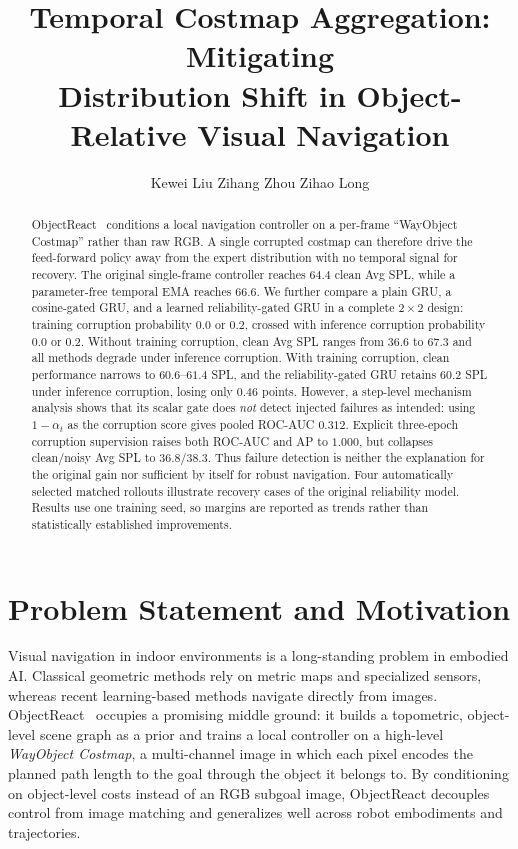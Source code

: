 \documentclass[conference]{IEEEtran}
\begin{document}
\title{Temporal Costmap Aggregation: Mitigating \\ Distribution Shift in Object-Relative Visual Navigation}

\author{Kewei Liu  \quad Zihang Zhou \quad Zihao Long}

\maketitle

\begin{abstract}
ObjectReact~\cite{garg2025objectreact} conditions a local navigation controller on a per-frame ``WayObject Costmap'' rather than raw RGB. A single corrupted costmap can therefore drive the feed-forward policy away from the expert distribution with no temporal signal for recovery. The original single-frame controller reaches $64.4$ clean Avg SPL, while a parameter-free temporal EMA reaches $66.6$. We further compare a plain GRU, a cosine-gated GRU, and a learned reliability-gated GRU in a complete $2{\times}2$ design: training corruption probability $0.0$ or $0.2$, crossed with inference corruption probability $0.0$ or $0.2$. Without training corruption, clean Avg SPL ranges from $36.6$ to $67.3$ and all methods degrade under inference corruption. With training corruption, clean performance narrows to $60.6$--$61.4$ SPL, and the reliability-gated GRU retains $60.2$ SPL under inference corruption, losing only $0.46$ points. However, a step-level mechanism analysis shows that its scalar gate does \emph{not} detect injected failures as intended: using $1-\alpha_t$ as the corruption score gives pooled ROC-AUC $0.312$. Explicit three-epoch corruption supervision raises both ROC-AUC and AP to $1.000$, but collapses clean/noisy Avg SPL to $36.8/38.3$. Thus failure detection is neither the explanation for the original gain nor sufficient by itself for robust navigation. Four automatically selected matched rollouts illustrate recovery cases of the original reliability model. Results use one training seed, so margins are reported as trends rather than statistically established improvements.
\end{abstract}

\IEEEpeerreviewmaketitle

\section{Problem Statement and Motivation}

Visual navigation in indoor environments is a long-standing problem in embodied AI. Classical geometric methods rely on metric maps and specialized sensors, whereas recent learning-based methods navigate directly from images. ObjectReact~\cite{garg2025objectreact} occupies a promising middle ground: it builds a topometric, object-level scene graph as a prior and trains a local controller on a high-level \emph{WayObject Costmap}, a multi-channel image in which each pixel encodes the planned path length to the goal through the object it belongs to. By conditioning on object-level costs instead of an RGB subgoal image, ObjectReact decouples control from image matching and generalizes well across robot embodiments and trajectories.
\end{document}
